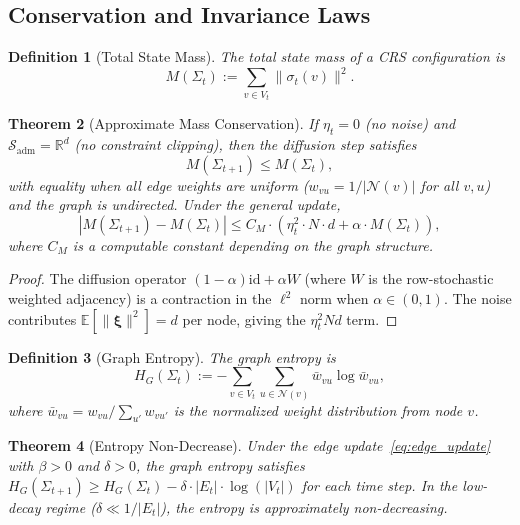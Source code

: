 \documentclass[11pt,a4paper]{article}
\newtheorem{definition}{Definition}[section]
\newtheorem{theorem}[definition]{Theorem}
\theoremstyle{remark}
\newcommand{\id}{\mathrm{id}}
\begin{document}
\subsection{Conservation and Invariance Laws}

\begin{definition}[Total State Mass]
\label{def:mass}
The \emph{total state mass} of a CRS configuration is
\[
  M(\Sigma_t) := \sum_{v \in V_t} \|\sigma_t(v)\|^2.
\]
\end{definition}

\begin{theorem}[Approximate Mass Conservation]
\label{thm:conservation}
If $\eta_t = 0$ (no noise) and
$\mathcal{S}_{\mathrm{adm}} = \mathbb{R}^d$ (no constraint clipping),
then the diffusion step satisfies
\[
  M(\Sigma_{t+1}) \leq M(\Sigma_t),
\]
with equality when all edge weights are uniform
($w_{vu} = 1/|\mathcal{N}(v)|$ for all $v, u$) and the graph is
undirected.  Under the general update,
\[
  |M(\Sigma_{t+1}) - M(\Sigma_t)|
  \leq
  C_M \cdot (\eta_t^2 \cdot N \cdot d + \alpha \cdot M(\Sigma_t)),
\]
where $C_M$ is a computable constant depending on the graph structure.
\end{theorem}

\begin{proof}
The diffusion operator $(1-\alpha)\id + \alpha W$ (where $W$ is the
row-stochastic weighted adjacency) is a contraction in the $\ell^2$
norm when $\alpha \in (0,1)$.  The noise contributes
$\mathbb{E}[\|\boldsymbol{\xi}\|^2] = d$ per node, giving the
$\eta_t^2 N d$ term.
\end{proof}

\begin{definition}[Graph Entropy]
\label{def:graph_entropy}
The \emph{graph entropy} is
\[
  H_G(\Sigma_t) :=
    -\sum_{v \in V_t} \sum_{u \in \mathcal{N}(v)}
    \bar{w}_{vu} \log \bar{w}_{vu},
\]
where $\bar{w}_{vu} = w_{vu} / \sum_{u'} w_{vu'}$ is the normalized
weight distribution from node $v$.
\end{definition}

\begin{theorem}[Entropy Non-Decrease]
\label{thm:entropy_crs}
Under the edge update~\eqref{eq:edge_update} with $\beta > 0$ and
$\delta > 0$, the graph entropy satisfies
$H_G(\Sigma_{t+1}) \geq H_G(\Sigma_t) - \delta \cdot |E_t| \cdot
\log(|V_t|)$ for each time step.  In the low-decay regime
($\delta \ll 1/|E_t|$), the entropy is approximately non-decreasing.
\end{theorem}
\end{document}
